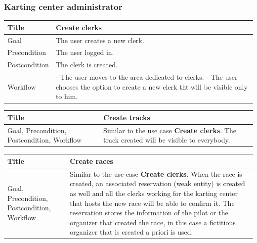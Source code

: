 \documentclass{beamer}
\begin{document}
\begin{frame}
    \frametitle{Karting center administrator}
    \begin{table}
        \tiny
        \begin{tabular}{|p{2cm}|p{6cm}|}
        \hline  
        Title & \textbf{Create clerks} \\
        \hline
        Goal & The user creates a new clerk. \\
        \hline
        Precondition & The user logged in. \\
        \hline
        Postcondition & The clerk is created. \\
        \hline
        Workflow &
        - The user moves to the area dedicated to clerks. \newline
        - The user chooses the option to create a new clerk tht will be visible only to him. \\
        \hline
        \end{tabular}
\end{table}

\begin{table}
    \tiny
    \begin{tabular}{|p{2cm}|p{6cm}|}
    \hline  
    Title & \textbf{Create tracks} \\
    \hline
    Goal, Precondition, Postcondition, Workflow & Similar to the use case \textbf{Create clerks}.
    The track created will be visible to everybody. \\
    \hline
    \end{tabular}
\end{table}

\begin{table}
    \tiny
    \begin{tabular}{|p{2cm}|p{6cm}|}
    \hline  
    Title & \textbf{Create races} \\
    \hline
    Goal, Precondition, Postcondition, Workflow & Similar to the use case \textbf{Create clerks}. 
    When the race is created, an associated reservation (weak entity) is created as well and all the clerks
    working for the karting center that hosts the new race will be able to confirm it.
    The reservation stores the information of the pilot or the organizer that created the race, 
    in this case a fictitious organizer that is created a priori is used.\\
    \hline
    \end{tabular}
\end{table}

\end{frame}
\end{document}
